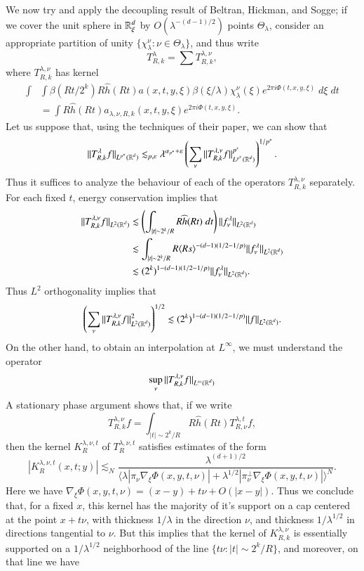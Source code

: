 We now try and apply the decoupling result of Beltran, Hickman, and Sogge; if we cover the unit sphere in $\operatorname{\mathbb{R}}^d_\xi$ by $O(\lambda^{-(d-1)/2})$ points $\Theta_\lambda$, consider an appropriate partition of unity $\{ \chi_\lambda^\nu : \nu \in \Theta_\lambda \}$, and thus write
%
\[ T_{R,k}^{\lambda} = \sum T_{R,k}^{\lambda,\nu}, \]
%
where $T_{R,k}^{\lambda,\nu}$ has kernel
%
\begin{align*}
    \int & \int \beta(Rt/2^k) R \widehat{h}(Rt) a(x,t,y,\xi) \beta(\xi / \lambda) \chi_\lambda^\nu(\xi) e^{2 \pi i \Phi(t,x,y,\xi)}\; d\xi\; dt\\
    &= \int R \widehat{h}(Rt) a_{\lambda,\nu,R,k}(x,t,y,\xi) e^{2 \pi i \Phi(t,x,y,\xi)}.
\end{align*}
%
Let us suppose that, using the techniques of their paper, we can show that
%
\[ \| T_{R,k}^\lambda f \|_{L^{p^*}(\operatorname{\mathbb{R}}^d)} \lesssim_{p,\varepsilon} \lambda^{\alpha_{p^*} + \varepsilon} \left( \sum_\nu \| T^{\lambda,\nu}_{R,k} f \|_{L^{p^*}(\operatorname{\mathbb{R}}^d)}^{p^*} \right)^{1/p^*}. \]
%
Thus it suffices to analyze the behaviour of each of the operators $T^{\lambda,\nu}_{R,k}$ separately. For each fixed $t$, energy conservation implies that
%
\begin{align*}
    \| T_{R,k}^{\lambda,\nu} f \|_{L^2(\operatorname{\mathbb{R}}^d)} &\lesssim \left( \int_{|t| \sim 2^k / R} R \widehat{h}(Rt)\; dt \right) \| f^\lambda_\nu \|_{L^2(\operatorname{\mathbb{R}}^d)} \\
    &\lesssim \int_{|t| \sim 2^k / R} R \langle Rs \rangle^{-(d-1)(1/2 - 1/p)} \| f^\lambda_\nu \|_{L^2(\operatorname{\mathbb{R}}^d)}\\
    &\lesssim (2^k)^{1 - (d-1)(1/2 - 1/p)} \| f^\lambda_\nu \|_{L^2(\operatorname{\mathbb{R}}^d)}.
\end{align*}
%
Thus $L^2$ orthogonality implies that
%
\[ \left( \sum_\nu \| T^{\lambda,\nu}_{R,k} f \|_{L^2(\operatorname{\mathbb{R}}^d)}^2 \right)^{1/2} \lesssim (2^k)^{1 - (d-1)(1/2 - 1/p)} \| f \|_{L^2(\operatorname{\mathbb{R}}^d)}. \]
%
On the other hand, to obtain an interpolation at $L^\infty$, we must understand the operator
%
\[ \sup_\nu \| T^{\lambda,\nu}_{R,k} f \|_{L^\infty(\operatorname{\mathbb{R}}^d)} \]
%
A stationary phase argument shows that, if we write
%
\[ T^{\lambda,\nu}_{R,k} f = \int_{|t| \sim 2^k / R} R \widehat{h}(Rt) T^{\lambda,t}_{R,\nu} f, \]
%
then the kernel $K^{\lambda,\nu,t}_{R}$ of $T^{\lambda,\nu,t}_{R}$ satisfies estimates of the form
%
\[ |K^{\lambda,\nu,t}_{R}(x,t;y)| \lesssim_N \frac{\lambda^{(d+1)/2}}{\Big\langle \lambda | \pi_\nu \nabla_\xi \Phi(x,y,t,\nu) | + \lambda^{1/2} | \pi_\nu^\perp \nabla_\xi \Phi(x,y,t,\nu) | \Big\rangle^N}. \]
%
Here we have $\nabla_\xi \Phi(x,y,t,\nu) = (x - y) + t \nu + O(|x - y|)$. Thus we conclude that, for a fixed $x$, this kernel has the majority of it's support on a cap centered at the point $x + t \nu$, with thickness $1/\lambda$ in the direction $\nu$, and thickness $1/\lambda^{1/2}$ in directions tangential to $\nu$. But this implies that the kernel of $K^{\lambda,\nu}_{R,k}$ is essentially supported on a $1/\lambda^{1/2}$ neighborhood of the line $\{ t \nu : |t| \sim 2^k/R \}$, and moreover, on that line we have
